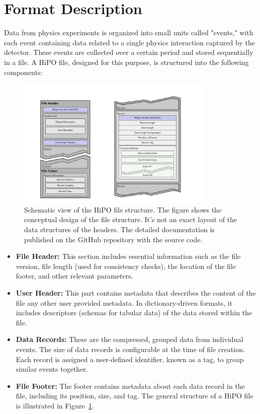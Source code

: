 \section{Format Description}

Data from physics experiments is organized into small units called "events," with each event containing data related to a single physics interaction captured by the detector. These events are collected over a certain period and stored sequentially in a file. A HiPO file, designed for this purpose, is structured into the following components:

\begin{figure}[h!]
  \begin{center}
    \includegraphics[width=0.85\textwidth]{images/file_structure.pdf}
 \end{center}
  \caption{Schematic view of the HiPO file structure. The figure shows the conceptual design of the file structure. It's not an exact layout of the data structures of the headers. The detailed documentation is published on the GitHub repository with the source code.}
 \label{schema:file}
\end{figure}


\begin{itemize}
\item {\bf File Header:} This section includes essential information such as the file version, file length (used for consistency checks), the location of the file footer, and other relevant parameters.
\item {\bf User Header:} This part contains metadata that describes the content of the file any other user provided metadata. In dictionary-driven formats, it includes descriptors (schemas for tabular data) of the data stored within the file.
\item {\bf Data Records:} These are the compressed, grouped data from individual events. The size of data records is configurable at the time of file creation. Each record is assigned a user-defined identifier, known as a tag, to group similar events together.
\item {\bf File Footer:} The footer contains metadata about each data record in the file, including its position, size, and tag.
The general structure of a HiPO file is illustrated in Figure~\ref{schema:file}.
\end{itemize}

